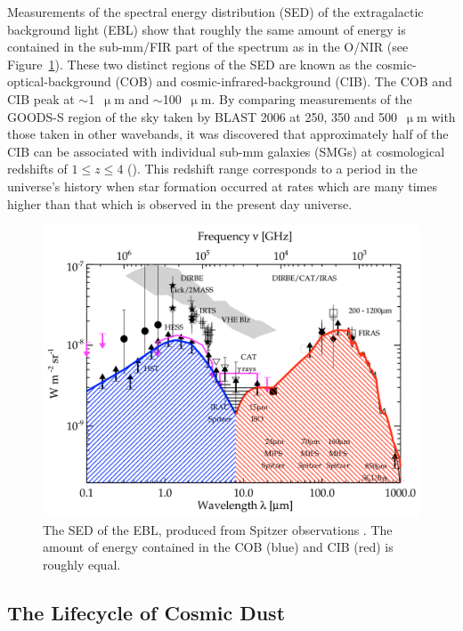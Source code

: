  Measurements of the spectral energy distribution (SED) of the extragalactic background light (EBL) show that roughly the same amount of energy is contained in the sub-mm/FIR part of the spectrum as in the O/NIR (see Figure~\ref{fig:EBL}). These two distinct regions of the SED are known as the cosmic-optical-background (COB) and cosmic-infrared-background (CIB). The COB and CIB peak at $\sim$1~$\upmu$m and $\sim$100~$\upmu$m. By comparing measurements of the GOODS-S region of the sky taken by BLAST 2006 at 250, 350 and 500~$\upmu$m with those taken in other wavebands, it was discovered that approximately half of the CIB can be associated with individual sub-mm galaxies (SMGs) at cosmological redshifts of $1 \leq z \leq 4$ (\citet{devlin2009over,marsden2009blast,pascale2009blast}). This redshift range corresponds to a period in the universe's history when star formation occurred at rates which are many times higher than that which is observed in the present day universe.

\begin{figure}[!htbp]
\centering
\includegraphics[width=\textwidth]{figures/intro/cob_cib}
\caption[The SED of extragalactic background light.]{The SED of the EBL, produced from Spitzer observations \citep{dole2006cosmic}. The amount of energy contained in the COB (blue) and CIB (red) is roughly equal.}
\label{fig:EBL}
\end{figure}

\subsection{The Lifecycle of Cosmic Dust}

